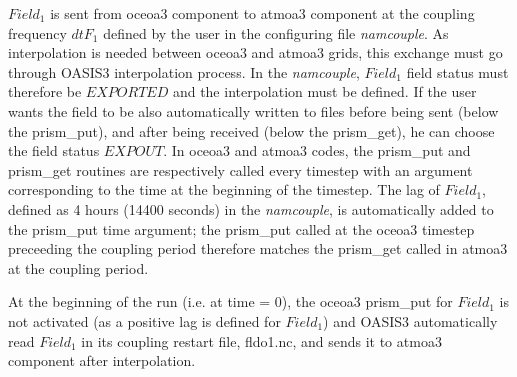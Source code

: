 $Field_1$ is sent from oceoa3 component to atmoa3 component at the
coupling frequency $dtF_1$ defined by the user in the configuring file
{\it namcouple}. As interpolation is
needed between oceoa3 and atmoa3 grids, this exchange must go through
OASIS3 interpolation process. In the {\it namcouple}, $Field_1$ field status
must therefore be $EXPORTED$ and the interpolation must be defined. If
the user wants the field to be also automatically written to files
before being sent (below the prism\_put), and after being received (below
the prism\_get), he can choose the field status $EXPOUT$. In oceoa3 and atmoa3
codes, the prism\_put and prism\_get routines are respectively called
every timestep with an argument corresponding to the time at the
beginning of the timestep. The lag of $Field_1$, defined as 4 hours
(14400 seconds) in the {\it namcouple}, is automatically added to the
prism\_put time argument; the prism\_put called at the oceoa3 timestep
preceeding the coupling period therefore matches the prism\_get called
in atmoa3 at the coupling period.

At the beginning of the run (i.e. at time = 0), the oceoa3 prism\_put for
$Field_1$ is not activated (as a positive lag is defined for
$Field_1$) and OASIS3 automatically read $Field_1$ in its coupling
restart file, fldo1.nc, and sends it to atmoa3 component after
interpolation. 




